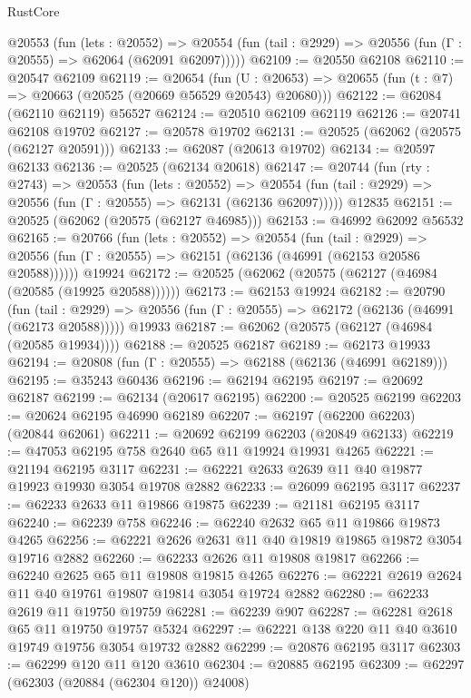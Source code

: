 \begin{lexlean}{RustCore}
\begin{coremodule}
    @20553
      (fun (lets : @20552) =>
      @20554 (fun (tail : @2929) => @20556 (fun (Γ : @20555) => @62064 (@62091 @62097)))))
@62109 := @20550 @62108
@62110 := @20547 @62109
@62119 := @20654
    (fun (U : @20653) => @20655 (fun (t : @7) => @20663 (@20525 (@20669 @56529 @20543) @20680)))
@62122 := @62084 (@62110 @62119) @56527
@62124 := @20510 @62109 @62119
@62126 := @20741 @62108 @19702
@62127 := @20578 @19702
@62131 := @20525 (@62062 (@20575 (@62127 @20591)))
@62133 := @62087 (@20613 @19702)
@62134 := @20597 @62133
@62136 := @20525 (@62134 @20618)
@62147 := @20744
    (fun (rty : @2743) =>
    @20553
      (fun (lets : @20552) =>
      @20554 (fun (tail : @2929) => @20556 (fun (Γ : @20555) => @62131 (@62136 @62097)))))
    @12835
@62151 := @20525 (@62062 (@20575 (@62127 @46985)))
@62153 := @46992 @62092 @56532
@62165 := @20766
    (fun (lets : @20552) =>
    @20554
      (fun (tail : @2929) =>
      @20556 (fun (Γ : @20555) => @62151 (@62136 (@46991 (@62153 @20586 @20588))))))
    @19924
@62172 := @20525 (@62062 (@20575 (@62127 (@46984 (@20585 (@19925 @20588))))))
@62173 := @62153 @19924
@62182 := @20790
    (fun (tail : @2929) => @20556 (fun (Γ : @20555) => @62172 (@62136 (@46991 (@62173 @20588)))))
    @19933
@62187 := @62062 (@20575 (@62127 (@46984 (@20585 @19934))))
@62188 := @20525 @62187
@62189 := @62173 @19933
@62194 := @20808 (fun (Γ : @20555) => @62188 (@62136 (@46991 @62189)))
@62195 := @35243 @60436
@62196 := @62194 @62195
@62197 := @20692 @62187
@62199 := @62134 (@20617 @62195)
@62200 := @20525 @62199
@62203 := @20624 @62195 @46990 @62189
@62207 := @62197 (@62200 @62203) (@20844 @62061)
@62211 := @20692 @62199 @62203 (@20849 @62133)
@62219 := @47053 @62195 @758 @2640 @65 @11 @19924 @19931 @4265
@62221 := @21194 @62195 @3117
@62231 := @62221 @2633 @2639 @11 @40 @19877 @19923 @19930 @3054 @19708 @2882
@62233 := @26099 @62195 @3117
@62237 := @62233 @2633 @11 @19866 @19875
@62239 := @21181 @62195 @3117
@62240 := @62239 @758
@62246 := @62240 @2632 @65 @11 @19866 @19873 @4265
@62256 := @62221 @2626 @2631 @11 @40 @19819 @19865 @19872 @3054 @19716 @2882
@62260 := @62233 @2626 @11 @19808 @19817
@62266 := @62240 @2625 @65 @11 @19808 @19815 @4265
@62276 := @62221 @2619 @2624 @11 @40 @19761 @19807 @19814 @3054 @19724 @2882
@62280 := @62233 @2619 @11 @19750 @19759
@62281 := @62239 @907
@62287 := @62281 @2618 @65 @11 @19750 @19757 @5324
@62297 := @62221 @138 @220 @11 @40 @3610 @19749 @19756 @3054 @19732 @2882
@62299 := @20876 @62195 @3117
@62303 := @62299 @120 @11 @120 @3610
@62304 := @20885 @62195
@62309 := @62297 (@62303 (@20884 (@62304 @120)) @24008)

\end{coremodule}
\end{lexlean}
